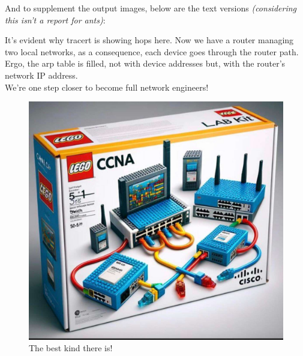 \documentclass[11pt,a4paper]{report}
\begin{document}
        And to supplement the output images, below are the text versions \textit{(considering this isn't a report for ants)}:
        \lstset{style=termoutputs}
        
        
        
        
        

        It's evident why tracert is showing hops here. Now we have a router managing two local networks, as a consequence, each device goes through the router path.\\
        Ergo, the arp table is filled, not with device addresses but, with the router's network IP address.\\

        We're one step closer to become full network engineers!\\
        \begin{figure}[h]
            \centering
            \includegraphics[scale=0.3]{ccna} 
            \caption{The best kind there is!}
            \label{fig:funnyccna}
        \end{figure}
\end{document}

